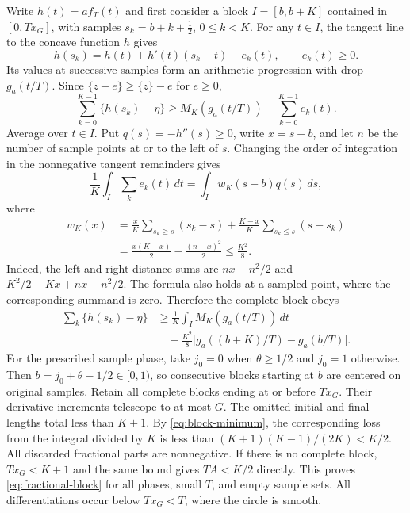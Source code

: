 \documentclass[11pt,reqno]{amsart}
\numberwithin{equation}{section}
\begin{document}
Write $h(t)=a f_T(t)$ and first consider a block $I=[b,b+K]$ contained
in $[0,Tx_G]$, with samples $s_k=b+k+\tfrac12$, $0\le k<K$.
For any $t\in I$, the tangent line to the concave function $h$ gives
\[
 h(s_k)=h(t)+h'(t)(s_k-t)-e_k(t),\qquad e_k(t)\ge0.
\]
Its values at successive samples form an arithmetic progression with
drop $g_a(t/T)$. Since $\{z-e\}\ge\{z\}-e$ for $e\ge0$,
\[
 \sum_{k=0}^{K-1}\{h(s_k)-\eta\}
 \ge M_K(g_a(t/T))-\sum_{k=0}^{K-1}e_k(t).
\]
Average over $t\in I$. Put $q(s)=-h''(s)\ge0$, write $x=s-b$, and
let $n$ be the number of sample points at or to the left of $s$.
Changing the order of integration in the nonnegative tangent remainders
gives
\[
 \frac1K\int_I\sum_ke_k(t)\,dt
 =\int_I w_K(s-b)q(s)\,ds,
\]
where
\begin{equation}
 \begin{aligned}
 w_K(x)
 &=\frac{x}{K}\sum_{s_k\ge s}(s_k-s)
       +\frac{K-x}{K}\sum_{s_k\le s}(s-s_k)\\
 &=\frac{x(K-x)}2-\frac{(n-x)^2}{2}
 \le\frac{K^2}{8}.
 \end{aligned}
 \label{eq:tangent-block-kernel}
\end{equation}
Indeed, the left and right distance sums are $nx-n^2/2$ and
$K^2/2-Kx+nx-n^2/2$. The formula also holds at a sampled point, where
the corresponding summand is zero. Therefore the complete block obeys
\[
 \begin{split}
 \sum_k\{h(s_k)-\eta\}
 &\ge\frac1K\int_I M_K(g_a(t/T))\,dt\\
 &\quad-\frac{K^2}{8}
       \bigl[g_a((b+K)/T)-g_a(b/T)\bigr].
 \end{split}
\]
For the prescribed sample phase, take $j_0=0$ when $\theta\ge1/2$ and
$j_0=1$ otherwise. Then $b=j_0+\theta-1/2\in[0,1)$, so consecutive
blocks starting at $b$ are centered on original samples. Retain all
complete blocks ending at or before $Tx_G$. Their derivative increments
telescope to at most $G$. The omitted initial and final lengths total
less than $K+1$. By \eqref{eq:block-minimum}, the corresponding loss
from the integral divided by $K$ is less than
$(K+1)(K-1)/(2K)<K/2$. All discarded fractional parts are nonnegative.
If there is no complete block, $Tx_G<K+1$ and the same bound gives
$TA<K/2$ directly. This proves \eqref{eq:fractional-block} for all
phases, small $T$, and empty sample sets. All differentiations occur
below $Tx_G<T$, where the circle is smooth.
\end{document}
